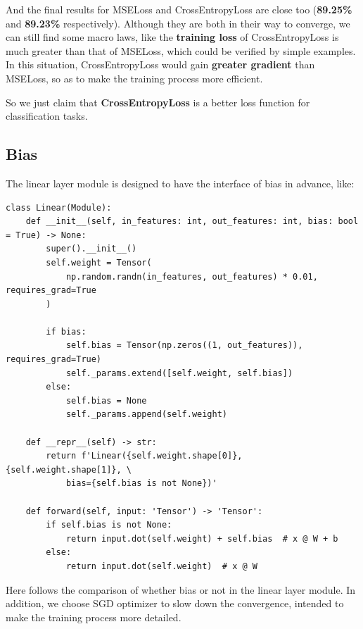 \documentclass[a4paper, 11pt]{article} %
\begin{document}
And the final results for MSELoss and CrossEntropyLoss are close too (\textbf{89.25\%} and
\textbf{89.23\%} respectively). Although they are both in their way to converge, we can
still find some macro laws, like the \textbf{training loss} of CrossEntropyLoss is much
greater than that of MSELoss, which could be verified by simple examples. In this situation,
CrossEntropyLoss would gain \textbf{greater gradient} than MSELoss, so as to make the
training process more efficient.

So we just claim that \textbf{CrossEntropyLoss} is a better loss function for classification
tasks.

\subsection{\textbf{Bias}}

The linear layer module is designed to have the interface of bias in advance, like:

\begin{lstlisting}
class Linear(Module):
    def __init__(self, in_features: int, out_features: int, bias: bool = True) -> None:
        super().__init__()
        self.weight = Tensor(
            np.random.randn(in_features, out_features) * 0.01, requires_grad=True
        )

        if bias:
            self.bias = Tensor(np.zeros((1, out_features)), requires_grad=True)
            self._params.extend([self.weight, self.bias])
        else:
            self.bias = None
            self._params.append(self.weight)

    def __repr__(self) -> str:
        return f'Linear({self.weight.shape[0]}, {self.weight.shape[1]}, \
			bias={self.bias is not None})'

    def forward(self, input: 'Tensor') -> 'Tensor':
        if self.bias is not None:
            return input.dot(self.weight) + self.bias  # x @ W + b
        else:
            return input.dot(self.weight)  # x @ W
\end{lstlisting}

Here follows the comparison of whether bias or not in the linear layer module. In addition,
we choose SGD optimizer to slow down the convergence, intended to make the training process
more detailed.
\end{document}
